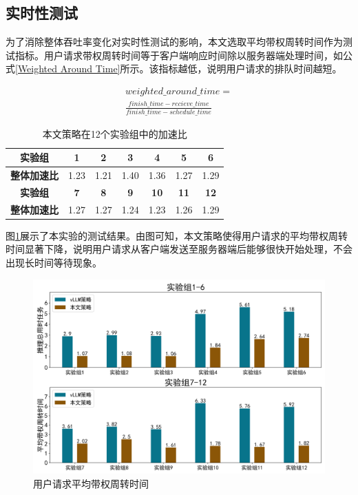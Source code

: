 \documentclass[a4paper, nosysfonts]{hpcchina}
\begin{document}
\subsection{实时性测试}
为了消除整体吞吐率变化对实时性测试的影响，本文选取平均带权周转时间作为测试指标。用户请求带权周转时间等于客户端响应时间除以服务器端处理时间，如公式\ref{Weighted Around Time}所示。该指标越低，说明用户请求的排队时间越短。 \par
\begin{equation}
  \begin{aligned}
    weighted\_around\_time = \\ \frac{finish\_time - recieve\_time}{finish\_time - schedule\_time}
  \end{aligned}
  \label{Weighted Around Time}
\end{equation}

\begin{table}[H]
  \centering
  \caption{本文策略在12个实验组中的加速比}
  \label{本文策略在12个实验组中的加速比}
  \small
  \begin{tabular}{|c|c|c|c|c|c|c|}
    \hline
    \textbf{实验组} & \textbf{1} & \textbf{2} & \textbf{3} & \textbf{4} & \textbf{5} & \textbf{6} \\ \hline
    \textbf{整体加速比} & 1.23 & 1.21 & 1.40 & 1.36 & 1.27 & 1.29 \\ \hline
    \textbf{实验组} & \textbf{7} & \textbf{8} & \textbf{9} & \textbf{10} & \textbf{11} & \textbf{12} \\ \hline
    \textbf{整体加速比} & 1.27 & 1.27 & 1.24 & 1.23 & 1.26 & 1.29 \\ \hline
  \end{tabular}
\end{table}

图\ref{用户请求平均带权周转时间}展示了本实验的测试结果。由图可知，本文策略使得用户请求的平均带权周转时间显著下降，说明用户请求从客户端发送至服务器端后能够很快开始处理，不会出现长时间等待现象。
\begin{figure}[!htbp]
  \centering
  \includegraphics[width=1\linewidth]
  {用户请求平均带权周转时间.png}
  \caption{用户请求平均带权周转时间}
  \label{用户请求平均带权周转时间}
\end{figure}
\end{document}
